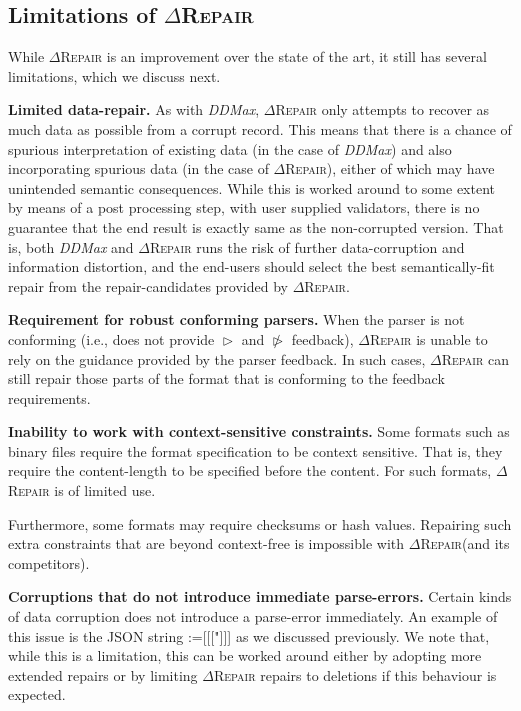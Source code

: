 \documentclass[sigconf,review,anonymous]{acmart}
\makeatletter
\newcommand{\revise}[1]{\textcolor{black}{#1}}
\def\Rincomplete{\texttt{\color{incompletecolor}\textbf{$\vartriangleright$}}\xspace}
\def\Rincorrect{\texttt{\color{incorrectcolor}\textbf{$\ntriangleright$}}\xspace}
\newcommand{\approach}{\textsc{$\Delta$Repair}\xspace}
\newcommand{\ddmax}{\textit{DDMax}\xspace}
\newcommand{\drepair}{\approach}
\newcommand\letterboxed[1]{%
\setlength{\fboxsep}{0pt}%
  \@tfor\@ii:=#1\do{%
    \fcolorbox{light-gray}{white}%
    {\texttt{\strut\@ii}}%
  }%
}
\makeatother
\begin{document}
\subsection{Limitations of \drepair}
While \drepair is an improvement over the state of the art, it still has
several limitations, which we discuss next.


\noindent\textbf{Limited data-repair.} As with \ddmax, \drepair only attempts
to recover as much data as possible from a corrupt record. This means that there
is a chance of spurious interpretation of existing data (in the case of \ddmax)
and also incorporating spurious data (in the case of \drepair), either of which
may have unintended semantic consequences. While this is
worked around to some extent by means of a post processing step, with user
supplied validators, there is no guarantee that the end result is exactly same
as the non-corrupted version. That is, both \ddmax and \drepair runs the risk
of further data-corruption and information distortion, and the end-users should
select the best semantically-fit repair from the repair-candidates provided by
\drepair.

\noindent\textbf{Requirement for robust conforming parsers.}
When the parser is not conforming (i.e., does not provide \Rincomplete and \Rincorrect feedback), \drepair is unable to rely on the
guidance provided by the parser feedback. In such cases, \drepair can
still repair those parts of the format that is conforming to the feedback
requirements.

\noindent\textbf{Inability to work with context-sensitive constraints.} 
Some formats such as binary files require the format specification to be
context sensitive. That is, they require the content-length to be specified
before the content. For such formats, \drepair is of limited use.

Furthermore,  some formats may require checksums or hash values. Repairing
such extra constraints that are beyond context-free is impossible with
\drepair (and its competitors).


\noindent\textbf{Corruptions that do not introduce immediate parse-errors.}
Certain kinds of data corruption does not introduce a parse-error immediately.
An example of this issue is the JSON string \letterboxed{[[["]]]} as we discussed
previously.
We note that, while this is a limitation, this can be worked around either
by adopting more extended repairs or by limiting \drepair repairs to deletions
if this behaviour is expected.
\end{document}
